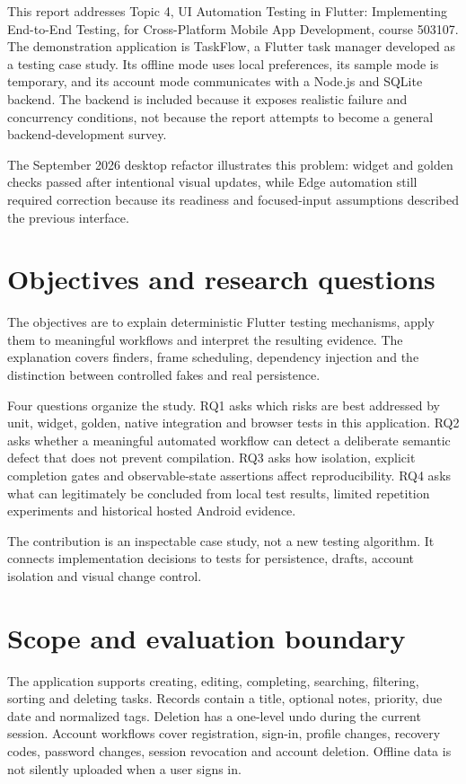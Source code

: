 \documentclass[12pt,a4paper,oneside]{report}
\begin{document}
This report addresses Topic 4, UI Automation Testing in Flutter: Implementing End-to-End Testing, for Cross-Platform Mobile App Development, course 503107. The demonstration application is TaskFlow, a Flutter task manager developed as a testing case study. Its offline mode uses local preferences, its sample mode is temporary, and its account mode communicates with a Node.js and SQLite backend. The backend is included because it exposes realistic failure and concurrency conditions, not because the report attempts to become a general backend-development survey.

The September 2026 desktop refactor illustrates this problem: widget and golden checks passed after intentional visual updates, while Edge automation still required correction because its readiness and focused-input assumptions described the previous interface.

\section{Objectives and research questions}
The objectives are to explain deterministic Flutter testing mechanisms, apply them to meaningful workflows and interpret the resulting evidence. The explanation covers finders, frame scheduling, dependency injection and the distinction between controlled fakes and real persistence.

Four questions organize the study. RQ1 asks which risks are best addressed by unit, widget, golden, native integration and browser tests in this application. RQ2 asks whether a meaningful automated workflow can detect a deliberate semantic defect that does not prevent compilation. RQ3 asks how isolation, explicit completion gates and observable-state assertions affect reproducibility. RQ4 asks what can legitimately be concluded from local test results, limited repetition experiments and historical hosted Android evidence.

The contribution is an inspectable case study, not a new testing algorithm. It connects implementation decisions to tests for persistence, drafts, account isolation and visual change control.

\section{Scope and evaluation boundary}
The application supports creating, editing, completing, searching, filtering, sorting and deleting tasks. Records contain a title, optional notes, priority, due date and normalized tags. Deletion has a one-level undo during the current session. Account workflows cover registration, sign-in, profile changes, recovery codes, password changes, session revocation and account deletion. Offline data is not silently uploaded when a user signs in.
\end{document}
